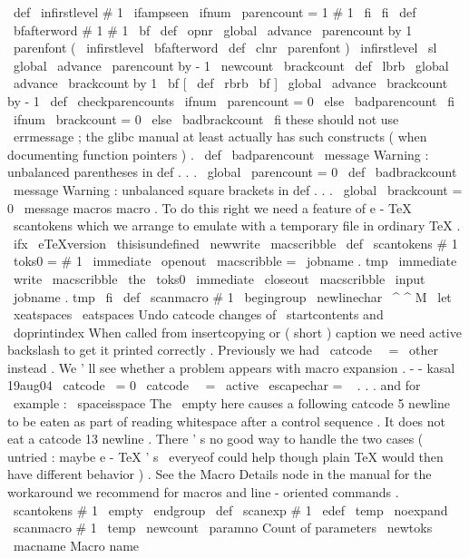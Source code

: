 {{{{{}
\
def
\
infirstlevel
#
1
{
%
\
ifampseen
\
ifnum
\
parencount
=
1
#
1
%
\
fi
\
fi
}
\
def
\
bfafterword
#
1
{
#
1
\
bf
}
\
def
\
opnr
{
%
\
global
\
advance
\
parencount
by
1
{
\
parenfont
(
}
%
\
infirstlevel
\
bfafterword
}
\
def
\
clnr
{
%
{
\
parenfont
)
}
%
\
infirstlevel
\
sl
\
global
\
advance
\
parencount
by
-
1
}
\
newcount
\
brackcount
\
def
\
lbrb
{
%
\
global
\
advance
\
brackcount
by
1
{
\
bf
[
}
%
}
\
def
\
rbrb
{
%
{
\
bf
]
}
%
\
global
\
advance
\
brackcount
by
-
1
}
\
def
\
checkparencounts
{
%
\
ifnum
\
parencount
=
0
\
else
\
badparencount
\
fi
\
ifnum
\
brackcount
=
0
\
else
\
badbrackcount
\
fi
}
%
these
should
not
use
\
errmessage
;
the
glibc
manual
at
least
actually
%
has
such
constructs
(
when
documenting
function
pointers
)
.
\
def
\
badparencount
{
%
\
message
{
Warning
:
unbalanced
parentheses
in
def
.
.
.
}
%
\
global
\
parencount
=
0
}
\
def
\
badbrackcount
{
%
\
message
{
Warning
:
unbalanced
square
brackets
in
def
.
.
.
}
%
\
global
\
brackcount
=
0
}
\
message
{
macros
}
%
macro
.
%
To
do
this
right
we
need
a
feature
of
e
-
TeX
\
scantokens
%
which
we
arrange
to
emulate
with
a
temporary
file
in
ordinary
TeX
.
\
ifx
\
eTeXversion
\
thisisundefined
\
newwrite
\
macscribble
\
def
\
scantokens
#
1
{
%
\
toks0
=
{
#
1
}
%
\
immediate
\
openout
\
macscribble
=
\
jobname
.
tmp
\
immediate
\
write
\
macscribble
{
\
the
\
toks0
}
%
\
immediate
\
closeout
\
macscribble
\
input
\
jobname
.
tmp
}
\
fi
\
def
\
scanmacro
#
1
{
\
begingroup
\
newlinechar
\
^
^
M
\
let
\
xeatspaces
\
eatspaces
%
%
Undo
catcode
changes
of
\
startcontents
and
\
doprintindex
%
When
called
from
insertcopying
or
(
short
)
caption
we
need
active
%
backslash
to
get
it
printed
correctly
.
Previously
we
had
%
\
catcode
\
\
=
\
other
instead
.
We
'
ll
see
whether
a
problem
appears
%
with
macro
expansion
.
-
-
kasal
19aug04
\
catcode
\
=
0
\
catcode
\
\
=
\
active
\
escapechar
=
\
%
%
.
.
.
and
for
\
example
:
\
spaceisspace
%
%
The
\
empty
here
causes
a
following
catcode
5
newline
to
be
eaten
as
%
part
of
reading
whitespace
after
a
control
sequence
.
It
does
not
%
eat
a
catcode
13
newline
.
There
'
s
no
good
way
to
handle
the
two
%
cases
(
untried
:
maybe
e
-
TeX
'
s
\
everyeof
could
help
though
plain
TeX
%
would
then
have
different
behavior
)
.
See
the
Macro
Details
node
in
%
the
manual
for
the
workaround
we
recommend
for
macros
and
%
line
-
oriented
commands
.
%
\
scantokens
{
#
1
\
empty
}
%
\
endgroup
}
\
def
\
scanexp
#
1
{
%
\
edef
\
temp
{
\
noexpand
\
scanmacro
{
#
1
}
}
%
\
temp
}
\
newcount
\
paramno
%
Count
of
parameters
\
newtoks
\
macname
%
Macro
name
}}}}
